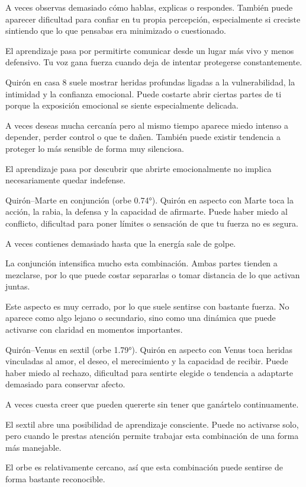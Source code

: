 \documentclass[11pt,a4paper]{article}
\begin{document}
A veces observas demasiado cómo hablas, explicas o respondes. También puede aparecer dificultad para confiar en tu propia percepción, especialmente si creciste sintiendo que lo que pensabas era minimizado o cuestionado.

El aprendizaje pasa por permitirte comunicar desde un lugar más vivo y menos defensivo. Tu voz gana fuerza cuando deja de intentar protegerse constantemente.

Quirón en casa 8 suele mostrar heridas profundas ligadas a la vulnerabilidad, la intimidad y la confianza emocional. Puede costarte abrir ciertas partes de ti porque la exposición emocional se siente especialmente delicada.

A veces deseas mucha cercanía pero al mismo tiempo aparece miedo intenso a depender, perder control o que te dañen. También puede existir tendencia a proteger lo más sensible de forma muy silenciosa.

El aprendizaje pasa por descubrir que abrirte emocionalmente no implica necesariamente quedar indefense.

Quirón–Marte en conjunción (orbe 0.74°).
Quirón en aspecto con Marte toca la acción, la rabia, la defensa y la capacidad de afirmarte. Puede haber miedo al conflicto, dificultad para poner límites o sensación de que tu fuerza no es segura.

A veces contienes demasiado hasta que la energía sale de golpe.

La conjunción intensifica mucho esta combinación. Ambas partes tienden a mezclarse, por lo que puede costar separarlas o tomar distancia de lo que activan juntas.

Este aspecto es muy cerrado, por lo que suele sentirse con bastante fuerza. No aparece como algo lejano o secundario, sino como una dinámica que puede activarse con claridad en momentos importantes.

Quirón–Venus en sextil (orbe 1.79°).
Quirón en aspecto con Venus toca heridas vinculadas al amor, el deseo, el merecimiento y la capacidad de recibir. Puede haber miedo al rechazo, dificultad para sentirte elegide o tendencia a adaptarte demasiado para conservar afecto.

A veces cuesta creer que pueden quererte sin tener que ganártelo continuamente.

El sextil abre una posibilidad de aprendizaje consciente. Puede no activarse solo, pero cuando le prestas atención permite trabajar esta combinación de una forma más manejable.

El orbe es relativamente cercano, así que esta combinación puede sentirse de forma bastante reconocible.
\end{document}
